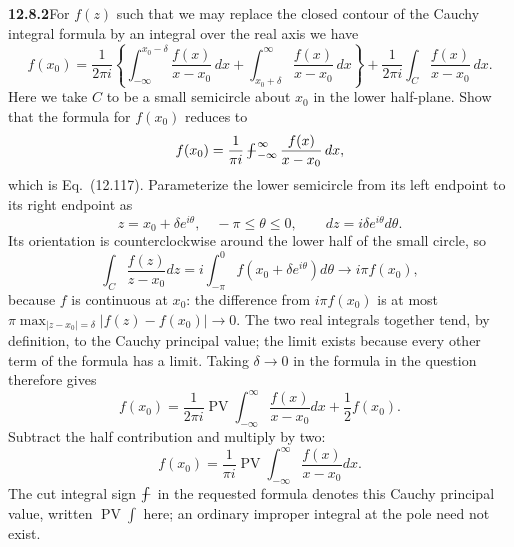 \par\bigskip
\noindent\textbf{12.8.2}\quad For $f(z)$ such that we may replace the closed
contour of the Cauchy integral formula by an integral over the real axis we
have
\[
f(x_{0})=\frac{1}{2\pi i}\left\{
\int_{-\infty}^{x_{0}-\delta}\frac{f(x)}{x-x_{0}}\,dx
+\int_{x_{0}+\delta}^{\infty}\frac{f(x)}{x-x_{0}}\,dx\right\}
+\frac{1}{2\pi i}\int_{C}\frac{f(x)}{x-x_{0}}\,dx.
\]
Here we take $C$ to be a small semicircle about $x_{0}$ in the lower
half-plane. Show that  the formula for $f(x_{0})$ reduces to
\[
f(x_{0})=\frac{1}{\pi i}\PVint_{-\infty}^{\infty}\frac{f(x)}{x-x_{0}}\,dx,
\]
which is Eq.~(12.117).
\solution
Parameterize the lower semicircle from its left endpoint to its right
endpoint as
\[
z=x_0+\delta e^{i\theta},\quad -\pi\le\theta\le0,\qquad
dz=i\delta e^{i\theta}d\theta.
\]
Its orientation is counterclockwise around the lower half of the small
circle, so
\[
\int_C\frac{f(z)}{z-x_0}dz
=i\int_{-\pi}^0f(x_0+\delta e^{i\theta})d\theta
\longrightarrow i\pi f(x_0),
\]
because $f$ is continuous at $x_0$: the difference from $i\pi f(x_0)$
is at most $\pi\max_{|z-x_0|=\delta}|f(z)-f(x_0)|\to0$.
The two real integrals together tend, by definition, to the Cauchy
principal value; the limit exists because every other term of the
formula has a limit.
Taking $\delta\to0$ in the formula in the question therefore gives
\[
f(x_0)=\frac1{2\pi i}\operatorname{PV}\int_{-\infty}^{\infty}
\frac{f(x)}{x-x_0}dx+\frac12f(x_0).
\]
Subtract the half contribution and multiply by two:
\[
\boxed{f(x_0)=\frac1{\pi i}\operatorname{PV}
\int_{-\infty}^{\infty}\frac{f(x)}{x-x_0}dx}.
\]
The cut integral sign $\PVint$ in the requested formula denotes this
Cauchy principal value, written $\operatorname{PV}\int$ here; an
ordinary improper integral at the pole need not exist.

